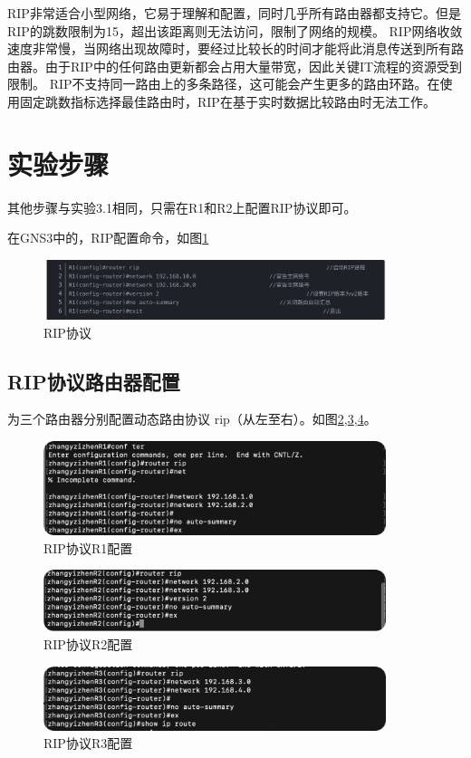 \documentclass[a4paper,12pt]{report}
\begin{document}
\begin{spacing}{1.5}
RIP非常适合小型网络，它易于理解和配置，同时几乎所有路由器都支持它。但是 RIP的跳数限制为15，超出该距离则无法访问，限制了网络的规模。
RIP网络收敛速度非常慢，当网络出现故障时，要经过比较长的时间才能将此消息传送到所有路由器。由于RIP中的任何路由更新都会占用大量带宽，因此关键IT流程的资源受到限制。
RIP不支持同一路由上的多条路径，这可能会产生更多的路由环路。在使用固定跳数指标选择最佳路由时，RIP在基于实时数据比较路由时无法工作。

\section{实验步骤}
其他步骤与实验3.1相同，只需在R1和R2上配置RIP协议即可。

在GNS3中的，RIP配置命令，如图\ref{rip}
\begin{figure}[htb!]
  \centering
\includegraphics[width=10cm]{figure/rip.png}
  \caption{RIP协议}
  \label{rip}
\end{figure} 

\subsection{RIP协议路由器配置}
为三个路由器分别配置动态路由协议 rip（从左至右）。如图\ref{19},\ref{20},\ref{21}。
\begin{figure}[htb!]
  \centering
\includegraphics[width=10cm]{figure/R1rip.png}
  \caption{RIP协议R1配置}
  \label{19}
\end{figure} 
\begin{figure}[htb!]
  \centering
\includegraphics[width=10cm]{figure/R2rip.png}
  \caption{RIP协议R2配置}
  \label{20}
\end{figure} 
\begin{figure}[htb!]
  \centering
\includegraphics[width=10cm]{figure/R3rip.png}
  \caption{RIP协议R3配置}
  \label{21}
\end{figure}


\end{spacing}
\end{document}
